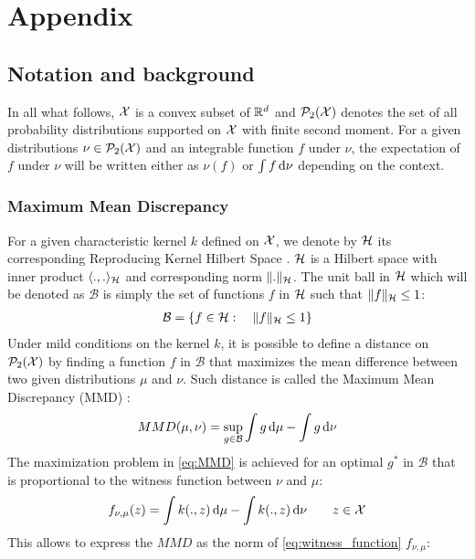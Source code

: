 
\section{Appendix}

\subsection{Notation and background}
In all what follows, ${{\mathcal X}}$ is a convex subset of ${{\mathbb R}}^d$ and $\mathcal{P}_2({{\mathcal X}})$ denotes the set of all probability distributions supported on ${{\mathcal X}}$ with finite second moment.
For a given distributions $\nu\in\mathcal{P}_2({{\mathcal X}})$ and an integrable function $f$ under $\nu$, the expectation of $f$ under $\nu$ will be written either as $\nu(f)$ or $\int f \mathop{}\!\mathrm{d}\nu$ depending on the context. 

\subsubsection{Maximum Mean Discrepancy}\label{subsec:MMD}
For a given characteristic kernel $k$ defined on ${{\mathcal X}}$, we denote by ${{\mathcal H}}$ its corresponding Reproducing Kernel Hilbert Space . ${{\mathcal H}}$ is a Hilbert space with inner product $\langle .,. \rangle_{{{\mathcal H}}}$ and corresponding norm $\Vert . \Vert_{{{\mathcal H}}}$. The unit ball in ${{\mathcal H}}$ which will be denoted as $\mathcal{B}$ is simply the set of functions $f$ in ${{\mathcal H}}$ such that $\Vert f\Vert_{{{\mathcal H}}}\leq 1 $:
\begin{align}\label{eq:unit_ball_RKHS}
	\mathcal{B} = \{ f\in {{\mathcal H}} : \quad \Vert f\Vert_{{{\mathcal H}}}\leq 1 \}
\end{align}
Under mild conditions  on the kernel $k$, it is possible to define a distance on $\mathcal{P}_2({{\mathcal X}})$ by finding a function $f$ in $\mathcal{B}$ that maximizes the mean difference between two given distributions $\mu$ and $\nu$. Such distance is called the Maximum Mean Discrepancy  (MMD) \cite{Gretton:2012}:
\begin{align}\label{eq:MMD}
	MMD(\mu,\nu) = \sup_{g\in \mathcal{B}} \int g\mathop{}\!\mathrm{d}\mu - \int g \mathop{}\!\mathrm{d}\nu
\end{align}
The maximization problem in \cref{eq:MMD} is achieved for an optimal $g^*$ in $\mathcal{B}$ that is proportional to the  witness function between $\nu$ and $\mu$:
\begin{align}\label{eq:witness_function}
	f_{\nu,\mu}(z) = \int k(.,z)\mathop{}\!\mathrm{d} \mu - \int k(.,z)\mathop{}\!\mathrm{d} \nu  \qquad z\in {{\mathcal X}}
\end{align}
This allows to express the $MMD$ as the norm of \cref{eq:witness_function} $f_{\nu,\mu}$:
